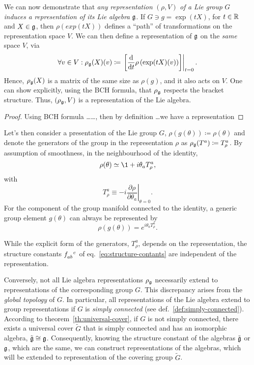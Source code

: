 We can now demonstrate that \emph{any representation} $(\rho, V)$ \emph{of a Lie group} $G$ \emph{induces a representation of its Lie algebra} $\mathfrak{g}$. If $G \ni g = \exp(tX)$, for $t\in \mathbb{R}$ and $X \in \mathfrak{g}$, then $\rho \left(exp(tX)\right)$ defines a “path” of transformations on the representation space $V$. We can then define a representation of $\mathfrak{g}$ on the \emph{same} space $V$, via
\begin{equation}
    \forall v \in V : \rho_{\mathfrak{g}}(X)(v) \coloneq \left. \left[ \frac{\mathop{}\!\mathrm{d}}{\mathop{}\!\mathrm{d} t} \rho \left( \exp(tX)(v) \right) \right] \right|_{t=0} .
\end{equation}
Hence, $\rho_{\mathfrak{g}}(X)$ is a matrix of the same size as $\rho(g)$, and it also acts on $V$. One can show explicitly, using the BCH formula, that $\rho_{\mathfrak{g}}$ respects the bracket structure. Thus, $(\rho_{\mathfrak{g}}, V)$ is a representation of the Lie algebra.
\begin{proof}
    \color{red} Using BCH formula \dots \dots, then by definition \dots we have a representation \color{black}
\end{proof}

Let's then consider a presentation of the Lie group $G$, $\rho(g(\theta)) \coloneq \rho(\theta)$ and denote the generators of the group in the representation $\rho$ as $\rho_{\mathfrak{g}} (T^a) \coloneq T^a_\rho$. By assumption of smoothness, in the neighbourhood of the identity,
\begin{equation}\label{eq:generators-rep}
    \rho(\theta) \simeq \1 + i \theta_a T_\rho^a,
\end{equation}
with 
\begin{equation}
    T_\rho^a \equiv \left. -i \frac{\partial \rho}{\partial \theta_a}\right|_{\theta=0}.
\end{equation}
For the component of the group manifold connected to the identity, a generic group element $g(\theta)$ can always be represented by
\begin{equation}\label{eq:exp-map-rep}
    \rho(g(\theta)) = e^{i \theta_a T_\rho^a} .
\end{equation}

\begin{remark}
    While the explicit form of the generators, $T_\rho^a$, depends on the representation, the structure constants $\tensor{f}{_a_b^c}$ of eq.~\eqref{eq:structure-contants} are independent of the representation.
\end{remark}

Conversely, not all Lie algebra representations $\rho_{\mathfrak{g}}$ necessarily extend to representations of the corresponding group $G$.  This discrepancy arises from the \emph{global topology} of $G$. In particular, all representations of the Lie algebra extend to group representations if $G$ is \emph{simply connected} (see def.~\ref{def:simply-connected}). According to theorem~\ref{th:universal-cover}, if $G$ is not simply connected, there exists a universal cover $\tilde{G}$ that is simply connected and has an isomorphic algebra, $\tilde{\mathfrak{g}} \cong \mathfrak{g}$. Consequently, knowing the structure constant of the algebras $\tilde{\mathfrak{g}}$ or $\mathfrak{g}$, which are the same, we can construct representations of the algebras, which will be extended to representation of the covering group $\tilde{G}$.

